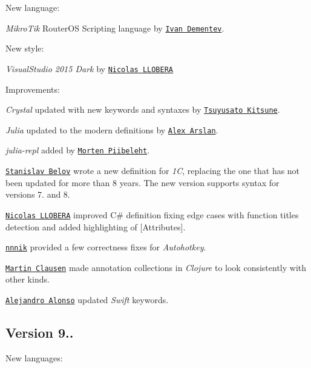 New language\+:


\begin{DoxyItemize}
\item {\itshape Mikro\+Tik} Router\+OS Scripting language by \href{https://github.com/DiVAN1x}{\tt Ivan Dementev}.
\end{DoxyItemize}

New style\+:


\begin{DoxyItemize}
\item {\itshape Visual\+Studio 2015 Dark} by \href{https://github.com/Nicolas01}{\tt Nicolas L\+L\+O\+B\+E\+RA}
\end{DoxyItemize}

Improvements\+:
\begin{DoxyItemize}
\item {\itshape Crystal} updated with new keywords and syntaxes by \href{https://github.com/MakeNowJust}{\tt Tsuyusato Kitsune}.
\item {\itshape Julia} updated to the modern definitions by \href{https://github.com/ararslan}{\tt Alex Arslan}.
\item {\itshape julia-\/repl} added by \href{https://github.com/mortenpi}{\tt Morten Piibeleht}.
\item \href{https://github.com/4ppl}{\tt Stanislav Belov} wrote a new definition for {\itshape 1C}, replacing the one that has not been updated for more than 8 years. The new version supports syntax for versions 7. and 8.
\item \href{https://github.com/Nicolas01}{\tt Nicolas L\+L\+O\+B\+E\+RA} improved C\# definition fixing edge cases with function titles detection and added highlighting of {\ttfamily \mbox{[}Attributes\mbox{]}}.
\item \href{https://github.com/nnnik}{\tt nnnik} provided a few correctness fixes for {\itshape Autohotkey}.
\item \href{https://github.com/maacl}{\tt Martin Clausen} made annotation collections in {\itshape Clojure} to look consistently with other kinds.
\item \href{https://github.com/Azoy}{\tt Alejandro Alonso} updated {\itshape Swift} keywords.
\end{DoxyItemize}

\subsection*{Version 9..}

New languages\+:


